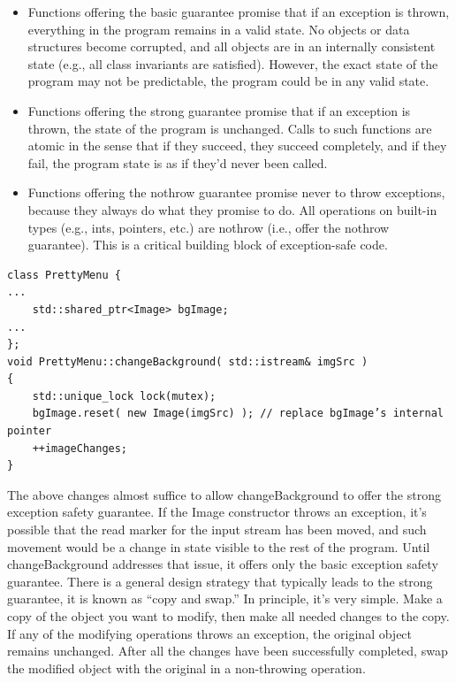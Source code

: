 \documentclass[a4paper,12pt,notitlepage]{article}
\begin{document}
\begin{itemize}
\item Functions offering the basic guarantee promise that if an exception is thrown, everything in the
  program remains in a valid state. No objects or data structures become corrupted, and all objects
  are in an internally consistent state (e.g., all class invariants are satisfied). However, the
  exact state of the program may not be predictable, the program could be in any valid state.

\item Functions offering the strong guarantee promise that if an exception is thrown, the state of the
  program is unchanged. Calls to such functions are atomic in the sense that if they succeed, they
  succeed completely, and if they fail, the program state is as if they’d never been called.

\item Functions offering the nothrow guarantee promise never to throw exceptions, because they always do
  what they promise to do. All operations on built-in types (e.g., ints, pointers, etc.) are nothrow
  (i.e., offer the nothrow guarantee). This is a critical building block of exception-safe code.
\end{itemize}

\begin{verbatim}
class PrettyMenu {
...
    std::shared_ptr<Image> bgImage;
...
};
void PrettyMenu::changeBackground( std::istream& imgSrc )
{
    std::unique_lock lock(mutex);
    bgImage.reset( new Image(imgSrc) ); // replace bgImage’s internal pointer
    ++imageChanges;
}
\end{verbatim}

The above changes almost suffice to allow changeBackground to offer the strong exception safety
guarantee. If the Image constructor throws an exception, it’s possible that the read marker for the
input stream has been moved, and such movement would be a change in state visible to the rest of the
program. Until changeBackground addresses that issue, it offers only the basic exception safety
guarantee. There is a general design strategy that typically leads to the strong guarantee, it is
known as “copy and swap.” In principle, it’s very simple. Make a copy of the object you want to
modify, then make all needed changes to the copy. If any of the modifying operations throws an
exception, the original object remains unchanged. After all the changes have been successfully
completed, swap the modified object with the original in a non-throwing operation.
\end{document}
